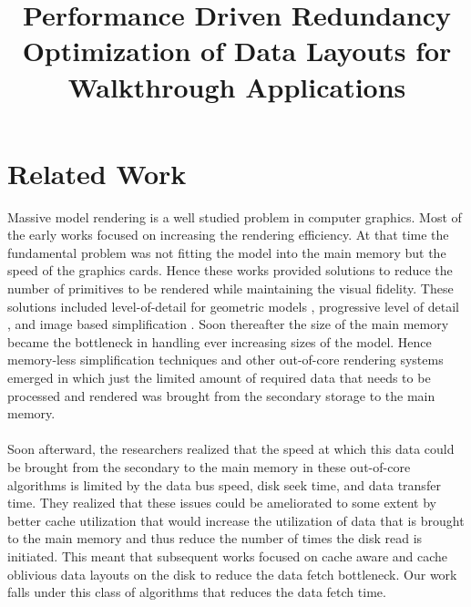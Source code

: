 \documentclass[conference]{acmsiggraph}
\title{Performance Driven Redundancy Optimization of Data Layouts for Walkthrough Applications}
\author{}
\begin{document}

\maketitle

\section{Related Work}

Massive model rendering is a well studied problem in computer graphics. Most of the early works focused on increasing the rendering efficiency. At that time the fundamental problem was not fitting the model into the main memory but the speed of the graphics cards. Hence these works provided solutions to reduce the number of primitives to be rendered while maintaining the visual fidelity. These solutions included level-of-detail for geometric models \cite{Luebke02}, progressive level of detail \cite{Hoppe:98b,Hoppe:97,Hoppe:96,SG:01}, and image based simplification \cite{ACWBZEHHSBWBM:99}. Soon thereafter the size of the main memory became the bottleneck in handling ever increasing sizes of the model. Hence memory-less simplification techniques \cite{LT:99}  and other out-of-core rendering systems \cite{Silva02,VM:02} emerged in which just the limited amount of required data that needs to be processed and rendered was brought from the secondary storage to the main memory. \\
\\
Soon afterward, the researchers realized that the speed at which this data could be brought from the secondary to the main memory in these out-of-core algorithms is limited by the data bus speed, disk seek time, and data transfer time. They realized that these issues could be ameliorated to some extent by better cache utilization that would increase the utilization of data that is brought to the main memory and thus reduce the number of times the disk read is initiated. This meant that subsequent works focused on cache aware \cite{ssdpaper} and cache oblivious data layouts \cite{cacheobliviouslayout,YOON:2006:MeshLayout} on the disk to reduce the  data fetch bottleneck. Our work falls under this class of algorithms that reduces the data fetch time. \\
\\
\end{document}
